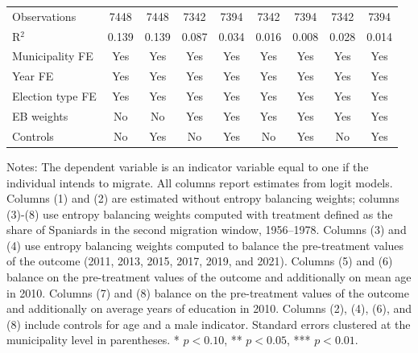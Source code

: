 \begin{table}
\begin{tabular}[t]{lcccccccc}
\addlinespace
Observations & 7448 & 7448 & 7342 & 7394 & 7342 & 7394 & 7342 & 7394\\
R$^2$ & 0.139 & 0.139 & 0.087 & 0.034 & 0.016 & 0.008 & 0.028 & 0.014\\
Municipality FE & Yes & Yes & Yes & Yes & Yes & Yes & Yes & Yes\\
Year FE & Yes & Yes & Yes & Yes & Yes & Yes & Yes & Yes\\
Election type FE & Yes & Yes & Yes & Yes & Yes & Yes & Yes & Yes\\
EB weights & No & No & Yes & Yes & Yes & Yes & Yes & Yes\\
Controls & No & Yes & No & Yes & No & Yes & No & Yes\\
\hline
\end{tabular}
\vspace{0.4em}
\begin{minipage}{\textwidth}
\footnotesize Notes: The dependent variable is an indicator variable equal to one if the individual intends to migrate. All columns report estimates from logit models. Columns (1) and (2) are estimated without entropy balancing weights; columns (3)-(8) use entropy balancing weights computed with treatment defined as the share of Spaniards in the second migration window, 1956–1978. Columns (3) and (4) use entropy balancing weights computed to balance the pre-treatment values of the outcome (2011, 2013, 2015, 2017, 2019, and 2021). Columns (5) and (6) balance on the pre-treatment values of the outcome and additionally on mean age in 2010. Columns (7) and (8) balance on the pre-treatment values of the outcome and additionally on average years of education in 2010. Columns (2), (4), (6), and (8) include controls for age and a male indicator. Standard errors clustered at the municipality level in parentheses. * $p<0.10$, ** $p<0.05$, *** $p<0.01$.
\end{minipage}
\end{table}

